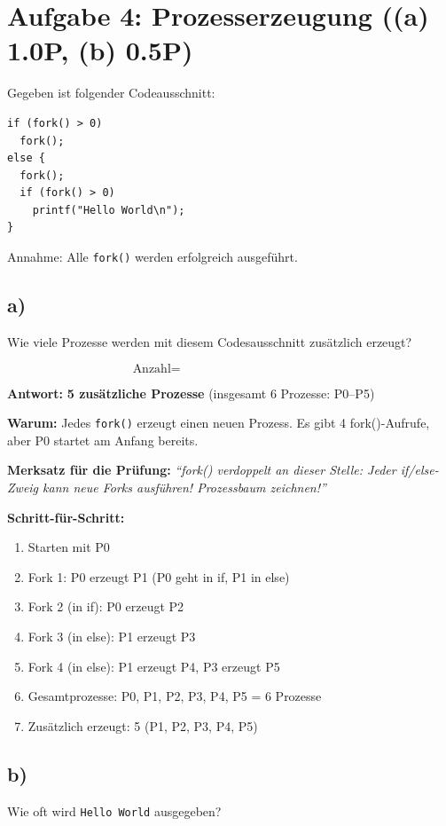 \documentclass[a4paper,11pt]{article}
\begin{document}
\section{Aufgabe 4: Prozesserzeugung ((a) 1.0P, (b) 0.5P)}
Gegeben ist folgender Codeausschnitt:

\begin{verbatim}
if (fork() > 0)
  fork();
else {
  fork();
  if (fork() > 0)
    printf("Hello World\n");
}
\end{verbatim}

Annahme: Alle \texttt{fork()} werden erfolgreich ausgeführt.

\subsection*{a)}
Wie viele Prozesse werden mit diesem Codesausschnitt zusätzlich erzeugt?

\[
\text{Anzahl} = \hspace{5cm}
\]

\begin{tcolorbox}[colback=green!15!white,colframe=green!70!black,title=\textbf{Lösung Aufgabe 4a}]
\textbf{Antwort:} \textbf{5 zusätzliche Prozesse} (insgesamt 6 Prozesse: P0--P5)

\textbf{Warum:} Jedes \texttt{fork()} erzeugt einen neuen Prozess. Es gibt 4 fork()-Aufrufe, aber P0 startet am Anfang bereits.

\textbf{Merksatz für die Prüfung:} \textit{``fork() verdoppelt an dieser Stelle: Jeder if/else-Zweig kann neue Forks ausführen! Prozessbaum zeichnen!''} 

\textbf{Schritt-für-Schritt:}
\begin{enumerate}[leftmargin=*]
  \item Starten mit P0
  \item Fork 1: P0 erzeugt P1 (P0 geht in if, P1 in else)
  \item Fork 2 (in if): P0 erzeugt P2
  \item Fork 3 (in else): P1 erzeugt P3
  \item Fork 4 (in else): P1 erzeugt P4, P3 erzeugt P5
  \item Gesamtprozesse: P0, P1, P2, P3, P4, P5 = 6 Prozesse
  \item Zusätzlich erzeugt: 5 (P1, P2, P3, P4, P5)
\end{enumerate}
\end{tcolorbox}

\subsection*{b)}
Wie oft wird \texttt{Hello World} ausgegeben?
\end{document}
